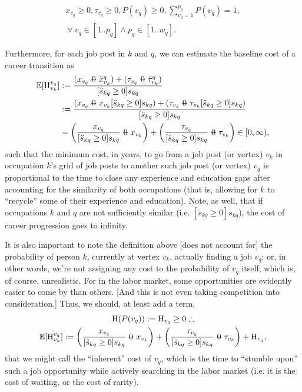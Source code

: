 \documentclass[12pt, a4paper]{article}
\makeatletter
\newcommand{\superimpose}[2]{{
  \ooalign{
    \hfil$\m@th#1\@firstoftwo#2$\hfil\cr
    \hfil$\m@th#1\@secondoftwo#2$\hfil\cr
  }
}}
\newcommand{\stack}[2]{\mathbin{\mathpalette\superimpose{{#1}{#2}}}}
\newcommand{\minuszero}{\stack{0}{-}}
\newcommand{\Eta}{\text{H}}
\makeatother
\begin{document}
\begin{gather}
  x_{v_q} \geq 0
  ,
  \tau_{v_q} \geq 0
  ,
  P(v_q) \geq 0
  ,
  \sum_{v_q=1}^{p_q} P(v_q) = 1
  , \\
  \
  \forall
  \
  v_q \in [1..p_q] \land p_q \in [1..w_q]
  .
\end{gather}

Furthermore, for each job post in $k$ and $q$, we can estimate the baseline
cost of a career transition as
\begin{align}
  \mathbb{E}[\Eta_{v_k}^{v_q}]
   & :=
  \frac{
    (x_{v_q} \minuszero \ddot{x}_{v_k}^{q})
    +
    (\tau_{v_q} \minuszero \ddot{\tau}_{v_k}^{q})
  }{
    [\ddot{s}_{kq} \geq 0] s_{kq}
  }
  \\
   & :=
  \frac{
    (x_{v_q} \minuszero x_{v_k} [\ddot{s}_{kq} \geq 0] s_{kq})
    +
    (\tau_{v_q} \minuszero \tau_{v_k} [\ddot{s}_{kq} \geq 0] s_{kq})
  }{
    [\ddot{s}_{kq} \geq 0] s_{kq}
  }
  \\
   & =
  \left(
  \frac{x_{v_q}}{[\ddot{s}_{kq} \geq 0] s_{kq}}
  \minuszero
  x_{v_k}
  \right)
  +
  \left(
  \frac{\tau_{v_q}}{[\ddot{s}_{kq} \geq 0] s_{kq}}
  \minuszero
  \tau_{v_k}
  \right)
  \in
  [0, \infty)
  ,
\end{align}
such that the minimum cost, in years, to go from a job post (or vertex) $v_k$
in occupation $k$'s grid of job posts to another such job post (or vertex) $v_q$
is proportional to the time to close any experience and education gaps after accounting for the similarity of both occupations (that is, allowing for $k$ to ``recycle'' some of their experience and education). Note, as well, that if occupations $k$ and $q$ are not sufficiently similar (i.e. $[\ddot{s}_{kq} \geq 0] s_{kq}$), the cost of career progression goes to infinity.

It is also important to note the definition above [does not account for] the
probability of person $k$, currently at vertex $v_k$, actually finding a job
$v_q$; or, in other words, we're not assigning any cost to the probability of
$v_q$ itself, which is, of course, unrealistic. For in the labor market, some
opportunities are evidently easier to come by than others. [And this is not
    even taking competition into consideration.] Thus, we should, at least add a
term,
\begin{gather}
  \Eta(P(v_q))
  :=
  \Eta_{v_q}
  \geq 0
  \therefore
  \\
  \mathbb{E}[\Eta_{v_k}^{v_q}]
  :=
  \left(
  \frac{x_{v_q}}{[\ddot{s}_{kq} \geq 0] s_{kq}}
  \minuszero
  x_{v_k}
  \right)
  +
  \left(
  \frac{\tau_{v_q}}{[\ddot{s}_{kq} \geq 0] s_{kq}}
  \minuszero
  \tau_{v_k}
  \right)
  +
  \Eta_{v_q}
  ,
\end{gather}
that we might call the ``inherent'' cost of $v_q$, which is the time to ``stumble upon'' such a job opportunity while actively searching in the labor market (i.e. it is the cost of waiting, or the cost of rarity).
\end{document}
